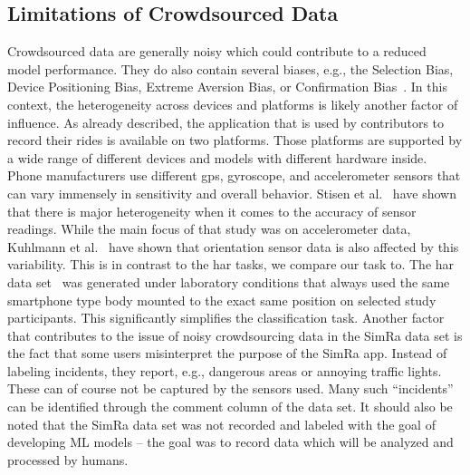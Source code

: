 \subsection{Limitations of Crowdsourced Data}
\label{subsec:limitations_of_crowdsourced_data}
Crowdsourced data are generally noisy which could contribute to a reduced model performance.
They do also contain several biases, e.g., the Selection Bias, Device Positioning Bias, Extreme Aversion Bias, or Confirmation Bias~\cite{basiri2019crowdsourced, chakraborty2017makes, kahneman1991anomalies}.
In this context, the heterogeneity across devices and platforms is likely another factor of influence.
As already described, the application that is used by contributors to record their rides is available on two platforms. 
Those platforms are supported by a wide range of different devices and models with different hardware inside. 
Phone manufacturers use different \ac{gps}, gyroscope, and accelerometer sensors that can vary immensely in sensitivity and overall behavior.
Stisen et al.~\cite{stisen2015smart} have shown that there is major heterogeneity when it comes to the accuracy of sensor readings. 
While the main focus of that study was on accelerometer data, Kuhlmann et al.~\cite{kuhlmann2021smartphone} have shown that orientation sensor data is also affected by this variability.
This is in contrast to the \ac{har} tasks, we compare our task to.
The \ac{har} data set~\cite{anguita2013public} was generated under laboratory conditions that always used the same smartphone type body mounted to the exact same position on selected study participants.
This significantly simplifies the classification task.
Another factor that contributes to the issue of noisy crowdsourcing data in the SimRa data set is the fact that some users misinterpret the purpose of the SimRa app.
Instead of labeling incidents, they report, e.g., dangerous areas or annoying traffic lights.
These can of course not be captured by the sensors used.
Many such ``incidents'' can be identified through the comment column of the data set.
It should also be noted that the SimRa data set was not recorded and labeled with the goal of developing ML models -- the goal was to record data which will be analyzed and processed by humans.


